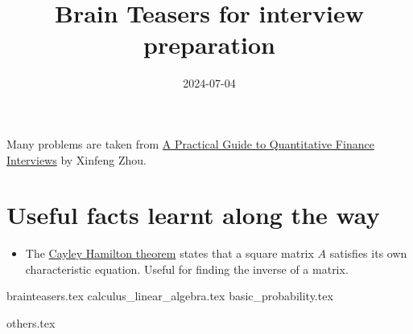 \documentclass{article}
\date{2024-07-04}
\title{Brain Teasers for interview preparation}
\begin{document}
  \maketitle
  Many problems are taken from \href{https://academyflex.com/wp-content/uploads/2024/03/a-practical-guide-to-quantitative-finance-interviews.pdf}{A Practical Guide to Quantitative Finance Interviews} by Xinfeng Zhou.
  \tableofcontents

  \newpage

  \section{Useful facts learnt along the way}

  \begin{itemize}
    \item The \href{https://en.wikipedia.org/wiki/Cayley\%E2\%80\%93Hamilton_theorem}{Cayley Hamilton theorem} states that a square matrix $A$ satisfies its own characteristic equation. Useful for finding the inverse of a matrix.
  \end{itemize}

  {brainteasers.tex}
  \newpage
  {calculus_linear_algebra.tex}
  \newpage
  {basic_probability.tex}
  \newpage

  {others.tex}



  
  
\end{document}
